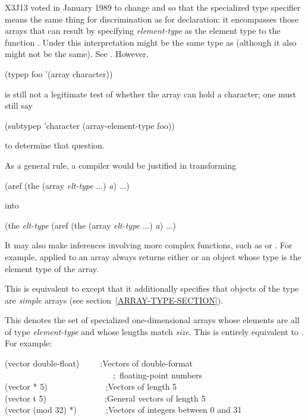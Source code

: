 \begin{flushdesc}
\begin{new}
X3J13 voted in January 1989
to change  and 
so that the specialized  type specifier
means the same thing for discrimination
as for declaration: it encompasses those arrays
that can result by specifying \emph{element-type} as the element type
to the function .
Under this interpretation  might be
the same type as 
(although it also might not be the same).
See .
However,
\begin{lisp}
(typep foo '(array character))
\end{lisp}
is still not a legitimate test of whether the array
 can hold a character; one must still say
\begin{lisp}
(subtypep 'character (array-element-type foo))
\end{lisp}
to determine that question.

As a general rule, a compiler would be justified in transforming
\begin{lisp}
(aref (the (array \emph{elt-type} ...) \emph{a}) ...)
\end{lisp}
into
\begin{lisp}
(the \emph{elt-type} (aref (the (array \emph{elt-type} ...) \emph{a}) ...)
\end{lisp}
It may also make inferences involving more complex functions,
such as  or .
For example,  applied to an array always returns either 
or an object whose type is the element type of the array.
\end{new}


\item[\cd{(simple-array \emph{element-type} \emph{dimensions})}]
This is equivalent
to  except that it additionally
specifies that objects of the type are \emph{simple} arrays
(see section~\ref{ARRAY-TYPE-SECTION}).

\item[\cd{(vector \emph{element-type} \emph{size})}]
This denotes the set of
specialized one-dimensional arrays whose elements are all of type \emph{
element-type} and whose lengths match \emph{size}.  This is entirely equivalent to
.
For example:
\begin{lisp}
(vector double-float)~~~~~;\textrm{Vectors of double-format} \\
~~~~~~~~~~~~~~~~~~~~~~~~~~;~\textrm{floating-point numbers} \\
(vector * 5)~~~~~~~~~~~~~~;\textrm{Vectors of length 5} \\
(vector t 5)~~~~~~~~~~~~~~;\textrm{General vectors of length 5} \\
(vector (mod 32) *)~~~~~~~;\textrm{Vectors of integers between 0 and 31}
\end{lisp}



\end{flushdesc}
